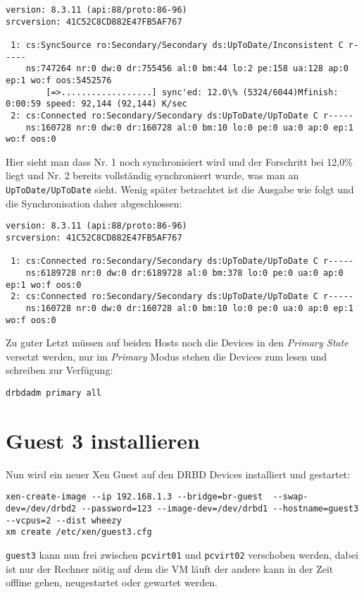\setupVerbatimOut
\begin{verbatim}
version: 8.3.11 (api:88/proto:86-96)
srcversion: 41C52C8CD882E47FB5AF767 

 1: cs:SyncSource ro:Secondary/Secondary ds:UpToDate/Inconsistent C r-----
    ns:747264 nr:0 dw:0 dr:755456 al:0 bm:44 lo:2 pe:158 ua:128 ap:0 ep:1 wo:f oos:5452576
        [=>..................] sync'ed: 12.0\% (5324/6044)Mfinish: 0:00:59 speed: 92,144 (92,144) K/sec
 2: cs:Connected ro:Secondary/Secondary ds:UpToDate/UpToDate C r-----
    ns:160728 nr:0 dw:0 dr:160728 al:0 bm:10 lo:0 pe:0 ua:0 ap:0 ep:1 wo:f oos:0
\end{verbatim}
Hier sieht man dass Nr. 1 noch synchronisiert wird und der  Forschritt bei 12,0\% liegt und  Nr. 2 bereits vollständig synchronisert wurde, was man an \verb#UpToDate/UpToDate# sieht.
Wenig später betrachtet ist die Ausgabe wie folgt und die Synchronisation daher abgeschlossen:

\setupVerbatimOut
\begin{verbatim}
version: 8.3.11 (api:88/proto:86-96)
srcversion: 41C52C8CD882E47FB5AF767 

 1: cs:Connected ro:Secondary/Secondary ds:UpToDate/UpToDate C r-----
    ns:6189728 nr:0 dw:0 dr:6189728 al:0 bm:378 lo:0 pe:0 ua:0 ap:0 ep:1 wo:f oos:0
 2: cs:Connected ro:Secondary/Secondary ds:UpToDate/UpToDate C r-----
    ns:160728 nr:0 dw:0 dr:160728 al:0 bm:10 lo:0 pe:0 ua:0 ap:0 ep:1 wo:f oos:0
\end{verbatim}

Zu guter Letzt müssen auf beiden Hosts noch die Devices in den \emph{Primary State} versetzt werden, nur im \emph{Primary} Modus stehen die Devices zum lesen und schreiben zur Verfügung:
\setupVerbatimOut
\begin{verbatim}
drbdadm primary all
\end{verbatim}

\section{Guest 3 installieren}
Nun wird ein neuer Xen Guest auf den DRBD Devices installiert und gestartet:
\setupVerbatimOut
\begin{verbatim}
xen-create-image --ip 192.168.1.3 --bridge=br-guest  --swap-dev=/dev/drbd2 --password=123 --image-dev=/dev/drbd1 --hostname=guest3 --vcpus=2 --dist wheezy
xm create /etc/xen/guest3.cfg
\end{verbatim}

\verb|guest3| kann nun frei zwischen \verb#pcvirt01# und \verb#pcvirt02# verschoben werden, dabei ist nur der Rechner nötig auf dem die VM läuft der andere kann in der Zeit offline gehen, neugestartet oder gewartet werden.
